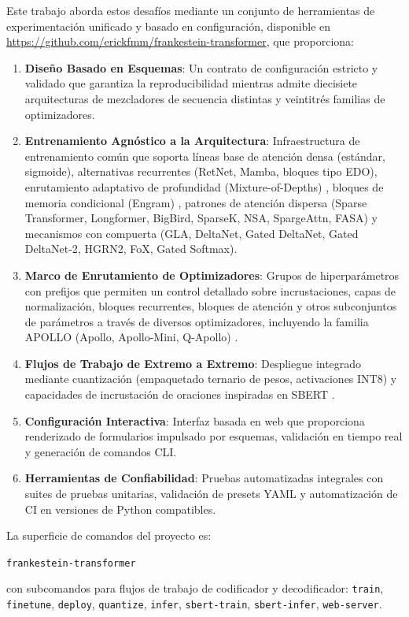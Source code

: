 Este trabajo aborda estos desafíos mediante un conjunto de herramientas de experimentación unificado y basado en configuración, disponible en \url{https://github.com/erickfmm/frankestein-transformer}, que proporciona:
\begin{enumerate}[leftmargin=*]
    \item \textbf{Diseño Basado en Esquemas}: Un contrato de configuración estricto y validado que garantiza la reproducibilidad mientras admite diecisiete arquitecturas de mezcladores de secuencia distintas y veintitrés familias de optimizadores.
    \item \textbf{Entrenamiento Agnóstico a la Arquitectura}: Infraestructura de entrenamiento común que soporta líneas base de atención densa (estándar, sigmoide), alternativas recurrentes (RetNet, Mamba, bloques tipo EDO), enrutamiento adaptativo de profundidad (Mixture-of-Depths) \citep{zhu2026mixtureofdepthsattention}, bloques de memoria condicional (Engram) \citep{cheng2026conditionalmemoryscalablelookup}, patrones de atención dispersa (Sparse Transformer, Longformer, BigBird, SparseK, NSA, SpargeAttn, FASA) y mecanismos con compuerta (GLA, DeltaNet, Gated DeltaNet, Gated DeltaNet-2, HGRN2, FoX, Gated Softmax).
    \item \textbf{Marco de Enrutamiento de Optimizadores}: Grupos de hiperparámetros con prefijos que permiten un control detallado sobre incrustaciones, capas de normalización, bloques recurrentes, bloques de atención y otros subconjuntos de parámetros a través de diversos optimizadores, incluyendo la familia APOLLO (Apollo, Apollo-Mini, Q-Apollo) \citep{zhu2025apollosgdlikememoryadamwlevel}.
    \item \textbf{Flujos de Trabajo de Extremo a Extremo}: Despliegue integrado mediante cuantización (empaquetado ternario de pesos, activaciones INT8) y capacidades de incrustación de oraciones inspiradas en SBERT \citep{reimers_sentence-bert_2019}.
    \item \textbf{Configuración Interactiva}: Interfaz basada en web que proporciona renderizado de formularios impulsado por esquemas, validación en tiempo real y generación de comandos CLI.
    \item \textbf{Herramientas de Confiabilidad}: Pruebas automatizadas integrales con suites de pruebas unitarias, validación de presets YAML y automatización de CI en versiones de Python compatibles.
\end{enumerate}

La superficie de comandos del proyecto es:
\begin{center}
\texttt{frankestein-transformer}
\end{center}
con subcomandos para flujos de trabajo de codificador y decodificador:
\texttt{train}, \texttt{finetune}, \texttt{deploy}, \texttt{quantize}, \texttt{infer}, \texttt{sbert-train}, \texttt{sbert-infer}, \texttt{web-server}.

